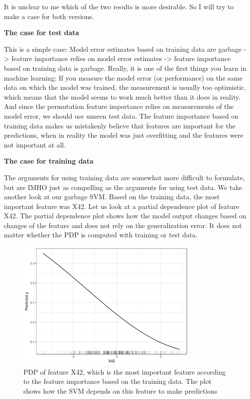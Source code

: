 \documentclass[
  10pt,
]{scrbook}
\begin{document}
It is unclear to me which of the two results is more desirable.
So I will try to make a case for both versions.

\textbf{The case for test data}

This is a simple case:
Model error estimates based on training data are garbage -\textgreater{} feature importance relies on model error estimates -\textgreater{} feature importance based on training data is garbage.
Really, it is one of the first things you learn in machine learning:
If you measure the model error (or performance) on the same data on which the model was trained, the measurement is usually too optimistic, which means that the model seems to work much better than it does in reality.
And since the permutation feature importance relies on measurements of the model error, we should use unseen test data.
The feature importance based on training data makes us mistakenly believe that features are important for the predictions, when in reality the model was just overfitting and the features were not important at all.

\textbf{The case for training data}

The arguments for using training data are somewhat more difficult to formulate, but are IMHO just as compelling as the arguments for using test data.
We take another look at our garbage SVM.
Based on the training data, the most important feature was X42.
Let us look at a partial dependence plot of feature X42.
The partial dependence plot shows how the model output changes based on changes of the feature and does not rely on the generalization error.
It does not matter whether the PDP is computed with training or test data.

\begin{figure}

{\centering \includegraphics[width=0.8\textwidth]{images/garbage-svm-pdp-1} 

}

\caption{PDP of feature X42, which is the most important feature according to the feature importance based on the training data. The plot shows how the SVM depends on this feature to make predictions}\label{fig:garbage-svm-pdp}
\end{figure}
\end{document}
